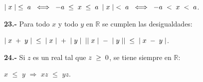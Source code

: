 \documentclass[12pt]{article}
\begin{document}
 \hspace{0.8cm}$\mid x\mid \hspace{0.1cm}\leq \hspace{0.1cm} a \hspace{0.2cm} \Longleftrightarrow \hspace{0.2cm} -a\hspace{0.1cm} \leq\hspace{0.1cm} x\hspace{0.1cm}\leq\hspace{0.1cm}a$ \hspace{1cm} $\mid x\mid \hspace{0.1cm}< \hspace{0.1cm} a \hspace{0.2cm} \Longleftrightarrow \hspace{0.2cm} -a\hspace{0.1cm} <\hspace{0.1cm} x\hspace{0.1cm}<\hspace{0.1cm}a$. \vspace{0.2cm}

\textbf{23.-} Para todo $x$ y todo $y$ en $\mathbb{R}$ se cumplen las desigualdades: \vspace{0.2cm}

$\mid x \hspace{0.1cm}+\hspace{0.1cm}y\mid \hspace{0.2cm} \leq \hspace{0.2cm} \mid x\mid \hspace{0.1cm} + \hspace{0.1cm} \mid y \mid $ \hspace{1cm} $\mid\mid x\mid \hspace{0.1cm}-\hspace{0.1cm}\mid y\mid\mid\hspace{0.2cm} \leq \hspace{0.2cm} \mid x \hspace{0.1cm} - \hspace{0.1cm} y \mid $.
\vspace{0.2cm}

\textbf{24.-} Si $z$ es un real tal que $z\hspace{0.1cm}\geq\hspace{0.1cm}0$, se tiene siempre en $\mathbb{R}:$ \vspace{0.2cm}

\hspace{4cm} \hspace{0.1cm}$x$\hspace{0.1cm} $\leq$ \hspace{0.1cm} $y$ $\Longrightarrow$ \hspace{0.1cm} $xz$ \hspace{0.1cm}$\leq$ \hspace{0.1cm} 
$yz$. \newpage
\end{document}
